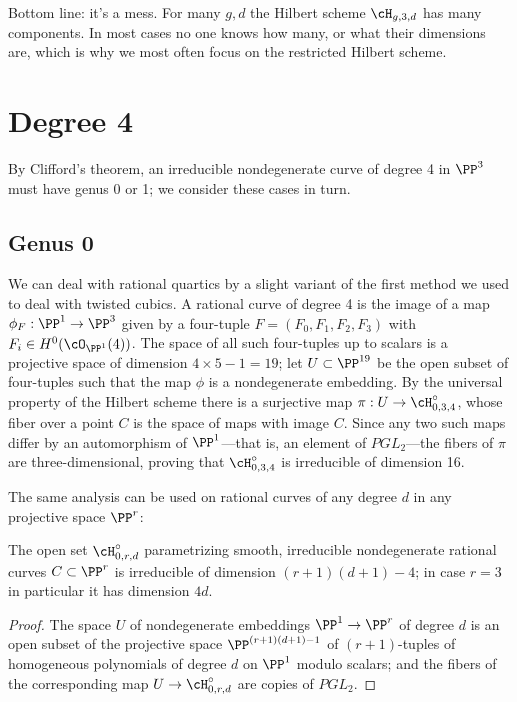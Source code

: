 Bottom line: it's a mess. For many $g,d$ the Hilbert scheme $\cH_{g,3,d}$ has many components. In most cases no one knows how many, or what their dimensions are, which is why we most often focus on the restricted Hilbert scheme. 

\section{Degree 4}

By Clifford's theorem, an irreducible nondegenerate curve of degree 4 in $\PP^{3}$ must have genus 0 or 1; we consider these cases in turn.

\subsection{Genus 0}\label{degree 4 genus 0}

We can deal with rational quartics by a slight variant of the first method we used to deal with twisted cubics. A rational curve of degree 4 is the image of a map $\phi_F : \PP^1 \to \PP^3$ given by a four-tuple $F = (F_0,F_1,F_2,F_3)$ with $F_i \in H^0(\cO_{\PP^1}(4))$. The space of all such four-tuples up to scalars is a projective space of dimension $4 \times 5 - 1 = 19$; let $U \subset \PP^{19}$ be the open subset of four-tuples such that the map $\phi$ is a nondegenerate embedding. By the universal property of the Hilbert scheme there is a surjective map $\pi : U \to \cH^\circ_{0,3,4}$, whose fiber over a point $C$ is the space of maps with image $C$. Since any two such maps differ by an automorphism of $\PP^1$---that is, an element of $PGL_2$---the fibers of $\pi$ are three-dimensional, proving that $\cH^\circ_{0,3,4}$ is irreducible of dimension 16. 

The same analysis can be used on rational curves of any degree $d$ in any projective space $\PP^r$:

\begin{proposition}\label{dimension of rational curves}
The open set $\cH^\circ_{0,r,d}$ parametrizing smooth, irreducible nondegenerate rational curves $C \subset \PP^r$ is irreducible of dimension $(r+1)(d+1)-4$; in case $r=3$ in particular it has dimension $4d$.
\end{proposition}

\begin{proof}
The space $U$ of nondegenerate embeddings $\PP^1 \to \PP^r$ of degree $d$ is an open subset of the projective space $\PP^{(r+1)(d+1)-1}$ of $(r+1)$-tuples of homogeneous polynomials of degree $d$ on $\PP^1$ modulo scalars; and the fibers of the corresponding map $U \to \cH^\circ_{0,r,d}$ are copies of $PGL_2$. 
\end{proof}

